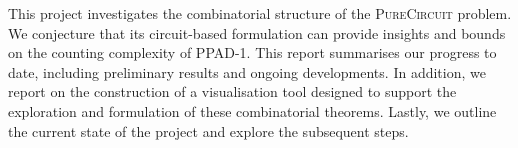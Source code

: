 This project investigates the combinatorial structure of the \textsc{PureCircuit} problem.
We conjecture that its circuit-based formulation can provide insights and bounds on the counting complexity of \textsc{PPAD-1}.
This report summarises our progress to date, including preliminary results and ongoing developments.
In addition, we report on the construction of a visualisation tool designed to support the exploration and formulation of these combinatorial theorems.
Lastly, we outline the current state of the project and explore the subsequent steps.
